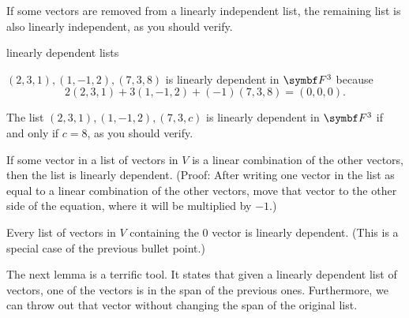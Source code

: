 \pagebreak[3]

If some  vectors are removed from a linearly independent list,  the remaining
list is also linearly independent, as you should verify.


{\addtolength{\abovedisplayskip}{-.023in}\addtolength{\belowdisplayskip}{-.023in} %

\begin{example}[linearlydep]{linearly dependent lists}
\begin{Itemize}
\item
$(2, 3, 1), (1, -1, 2), (7, 3, 8)$
is linearly dependent in $\F{3}$ because
\[
2(2, 3, 1) + 3(1, -1, 2) + (-1)(7, 3, 8) = (0, 0, 0).
\]
\item
The list $(2, 3, 1), (1, -1, 2), (7, 3, c)$ is linearly dependent in $\F{3}$ if and only if $c = 8$, as you should verify.
\item
If some vector in a list of vectors in $V$ is a linear combination of the other vectors, then the list is linearly dependent. (Proof: After writing one vector in the list as equal to a linear combination of the other vectors, move that vector to the other side of the equation, where it will be multiplied by $-1$.)
\item
Every list of vectors in $V$ containing the $0$ vector is
linearly dependent. (This is a special case of the previous bullet point.)
\end{Itemize}
\exampleitemend
\vspace{2bp}
\end{example}

The next lemma is a terrific tool.  It states that given a linearly dependent
list of vectors, one of the vectors is in the
span of the previous ones. Furthermore, we can throw out that vector
without changing the span of the original list.

}
